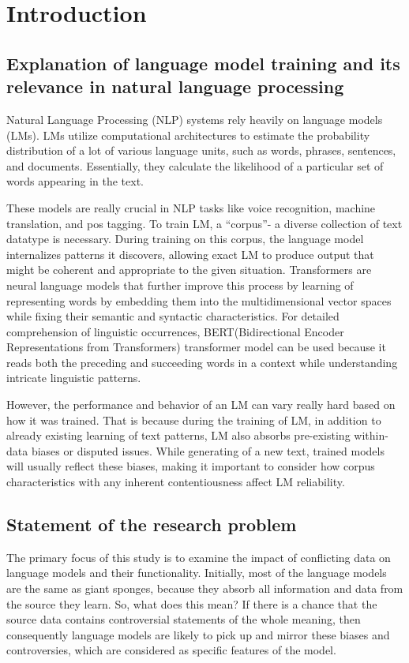 \section{Introduction}
\subsection{Explanation of language model training and its relevance in natural language processing} Natural Language Processing (NLP) systems rely heavily on language models (LMs). LMs utilize computational architectures to estimate the probability distribution of a lot of various language units, such as words, phrases, sentences, and documents. Essentially, they calculate the likelihood of a particular set of words appearing in the text. \cite{KGK2016}

These models are really crucial in NLP tasks like voice recognition, machine translation, and pos tagging. To train LM, a “corpus”- a diverse collection of text datatype is necessary.  During training on this corpus, the language model internalizes patterns it discovers, allowing exact LM to produce output that might be coherent and appropriate to the given situation. Transformers are neural language models that further improve this process by learning of representing words by embedding them into the multidimensional vector spaces while fixing their semantic and syntactic characteristics. For detailed comprehension of linguistic occurrences, BERT(Bidirectional Encoder Representations from Transformers) transformer model can be used because it reads both the preceding and succeeding words in a context while understanding intricate linguistic patterns. \cite{jd2019}


However, the performance and behavior of an LM can vary really hard based on how it was trained. That is because during the training of LM, in addition to already existing learning of text patterns, LM also absorbs pre-existing within-data biases or disputed issues. While generating of a new text, trained models will usually reflect these biases, making it important to consider how corpus characteristics with any inherent contentiousness affect LM reliability.

\subsection{Statement of the research problem}
The primary focus of this study is to examine the impact of conflicting data on language models and their functionality. Initially, most of the language models are the same as giant sponges, because they absorb all information and data from the source they learn. So, what does this mean? If there is a chance that the source data contains controversial statements of the whole meaning, then consequently language models are likely to pick up and mirror these biases and controversies, which are considered as specific features of the model.

